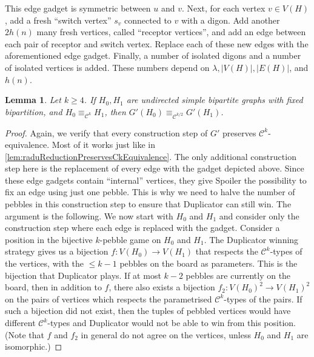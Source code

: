 \documentclass[11pt, DIV=15]{scrarticle}
\theoremstyle{definition}
\theoremstyle{plain}
\newtheorem{lemma}[definition]{Lemma}
\theoremstyle{remark}
\begin{document}
This edge gadget is symmetric between $u$ and $v$. Next, for each vertex $v \in V(H)$, add a fresh \enquote{switch vertex} $s_v$ connected to $v$ with a digon. Add another $2h(n)$ many fresh vertices, called \enquote{receptor vertices}, and add an edge between each pair of receptor and switch vertex. Replace each of these new edges with the aforementioned edge gadget. 
Finally, a number of isolated digons and a number of isolated vertices is added. These numbers depend on $\lambda, |V(H)|, |E(H)|$, and $h(n)$.
\begin{lemma}
	\label{lem:raduReductionPreservesCkEquivalence2}
	Let $k \geq 4$.
	If $H_0, H_1$ are undirected simple bipartite graphs with fixed bipartition, and $H_0 \equiv_{\mathcal{C}^k} H_1$, then $G'(H_0) \equiv_{\mathcal{C}^{k/2}} G'(H_1)$.
\end{lemma}	
\begin{proof}
Again, we verify that every construction step of $G'$ preserves $\mathcal{C}^k$-equivalence. 
Most of it works just like in \cref{lem:raduReductionPreservesCkEquivalence}. The only additional construction step here is the replacement of every edge with the gadget depicted above. 
Since these edge gadgets contain ``internal'' vertices, they give Spoiler the possibility to fix an edge using just one pebble. This is why we need to halve the number of pebbles in this construction step to ensure that Duplicator can still win. 
The argument is the following. We now start with $H_0$ and $H_1$ and
consider only the construction step where each edge is replaced with
the gadget. Consider a position in the bijective $k$-pebble game on
$H_0$ and $H_1$. The Duplicator winning strategy gives us a bijection
$f\colon V(H_0) \to V(H_1)$ that respects the $\mathcal{C}^k$-types of
the vertices, with the $\leq k-1$ pebbles on the board as
parameters. This is the bijection that Duplicator plays. If at most
$k-2$ pebbles are currently on the board, then in addition to $f$,
there also exists a bijection $f_2\colon V(H_0)^2 \to V(H_1)^2$ on the
pairs of vertices which respects the parametrised
$\mathcal{C}^k$-types of the pairs. If such a bijection did not exist,
then the tuples of pebbled vertices would have different
$\mathcal{C}^k$-types and Duplicator would not be able to win from
this position. (Note that $f$ and $f_2$ in general do not agree on the vertices, unless $H_0$ and $H_1$ are isomorphic.)   

\end{proof}
\end{document}
